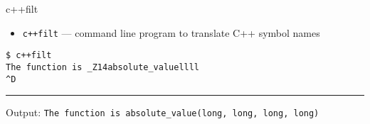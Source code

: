 \begin{frame}[fragile,label=cppFilt]{c++filt}
    \begin{itemize}
        \item \texttt{c++filt} --- command line program to translate C++ symbol names
    \end{itemize}
\begin{Verbatim}
$ c++filt
The function is _Z14absolute_valuellll
^D
\end{Verbatim}
\hrule
Output: \texttt{The function is \texttt{absolute\_value(long, long, long, long)}}
\end{frame}
